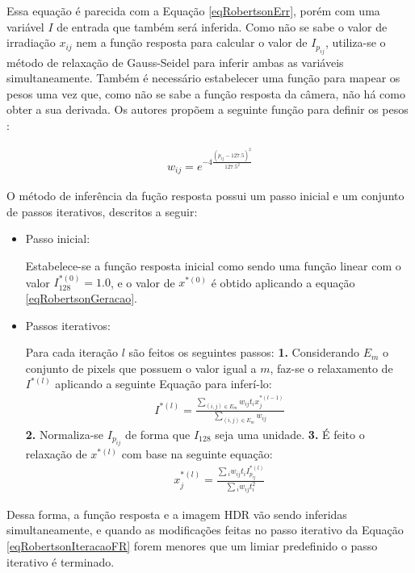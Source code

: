 Essa equação é parecida com a Equação \ref{eqRobertsonErr}, porém com uma variável $I$ de entrada que também será inferida. Como não se sabe o valor de irradiação $x_{ij}$ nem a função resposta para calcular o valor de $I_{p_{ij}}$, utiliza-se o método de relaxação de Gauss-Seidel para inferir ambas as variáveis simultaneamente. Também é necessário estabelecer uma função para mapear os pesos uma vez que, como não se sabe a função resposta da câmera, não há como obter a sua derivada. Os autores propõem a seguinte função para definir os pesos \cite{robertson2}:

\begin{align} \label{eqRobertsonErr3}
	w_{ij} = e^{-4\frac{(p_{ij}-127.5)^2}{127.5^2}}
\end{align}

O método de inferência da fução resposta possui um passo inicial e um conjunto de passos iterativos, descritos a seguir:

\begin{itemize}
\item Passo inicial:

Estabelece-se a função resposta inicial como sendo uma função linear com o valor $I_{128}^{*(0)} = 1.0$, e o valor de $x^{*(0)}$ é obtido aplicando a equação \ref{eqRobertsonGeracao}.

\item Passos iterativos:

Para cada iteração $l$ são feitos os seguintes passos:
\subitem \textbf{1.} Considerando $E_m$ o conjunto de pixels que possuem o valor igual a $m$, faz-se o relaxamento de $I^{*(l)}$ aplicando a seguinte Equação para inferí-lo:
\begin{align} \label{eqRobertsonIteracaoFR}
	I^{*(l)} = \frac{\sum\limits_{(i,j) \in E_m}{w_{ij}t_{i}x_{j}^{*(l-1)}}}{\sum\limits_{(i,j) \in E_m}{w_{ij}}}
\end{align}
\subitem \textbf{2.} Normaliza-se $I_{p_{ij}}$ de forma que $I_{128}$ seja uma unidade.
\subitem \textbf{3.} É feito o relaxação de $x^{*(l)}$ com base na seguinte equação:
\begin{align} \label{eqRobertsonIteracaoHDR}
	x^{*(l)}_j = \frac{\sum{_i w_{ij}t_{i}I^{*(l)}_{p_{ij}}}}{\sum{_i w_{ij}t_{i}^2}}
\end{align}
\end{itemize}

Dessa forma, a função resposta e a imagem HDR vão sendo inferidas simultaneamente, e quando as modificações feitas no passo iterativo da Equação \ref{eqRobertsonIteracaoFR} forem menores que um limiar predefinido o passo iterativo é terminado.

